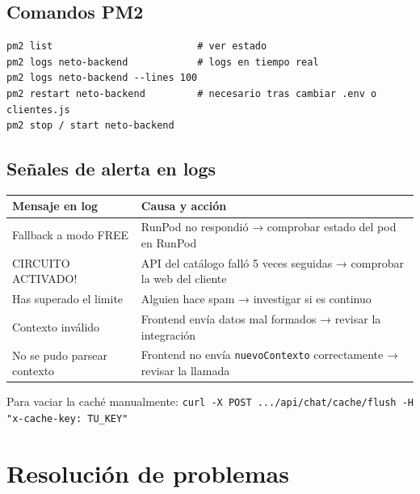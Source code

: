 \documentclass[12pt, a4paper]{article}
\begin{document}
\subsection{Comandos PM2}

\begin{lstlisting}[style=bash]
pm2 list                         # ver estado
pm2 logs neto-backend            # logs en tiempo real
pm2 logs neto-backend --lines 100
pm2 restart neto-backend         # necesario tras cambiar .env o clientes.js
pm2 stop / start neto-backend
\end{lstlisting}

\subsection{Señales de alerta en logs}

\begin{center}
\renewcommand{\arraystretch}{1.3}
\begin{tabularx}{\textwidth}{>{\ttfamily\footnotesize\raggedright\arraybackslash}p{5.8cm} >{\raggedright\arraybackslash}X}
\toprule
\textbf{Mensaje en log} & \textbf{Causa y acción} \\
\midrule
Fallback a modo FREE            & RunPod no respondió → comprobar estado del pod en RunPod \\
CIRCUITO ACTIVADO!              & API del catálogo falló 5 veces seguidas → comprobar la web del cliente \\
Has superado el limite          & Alguien hace spam → investigar si es continuo \\
Contexto inválido               & Frontend envía datos mal formados → revisar la integración \\
No se pudo parsear contexto     & Frontend no envía \normalfont\texttt{nuevoContexto} correctamente → revisar la llamada \\
\bottomrule
\end{tabularx}
\end{center}

Para vaciar la caché manualmente: \quad \texttt{curl -X POST .../api/chat/cache/flush -H "x-cache-key: TU\_KEY"}

\section{Resolución de problemas}
\end{document}
